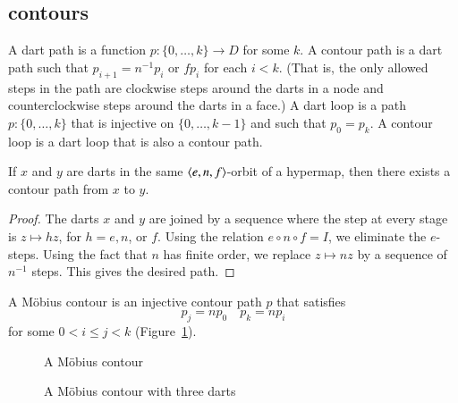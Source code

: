 \subsection{contours}

\begin{definition}  A dart path is a function $p:\{0,\ldots,k\}\to D$
for some $k$.  A contour path is a dart path such that $p_{i+1} =
n^{-1} p_i$ or $f p_i$ for each $i<k$.  (That is, the only allowed
steps in the path are clockwise steps around the darts in a node and
counterclockwise steps around the darts in a face.)  A dart loop is
a path $p:\{0,\ldots,k\}$ that is injective on $\{0,\ldots,k-1\}$
and such that $p_0 = p_k$.  A contour loop is a dart loop that is
also a contour path.
\end{definition}

\begin{lemma}\label{lemma:connect-contour}  If $x$ and $y$ are darts
in the same $\langle e,n,f\rangle$-orbit of a hypermap, then there exists
a contour path from $x$ to $y$.
\end{lemma}

\begin{proof} 
The darts
$x$ and $y$ are joined by a sequence where the step at every stage
is $z\mapsto h z$, for $h=e,n$, or $f$.  Using the relation $e\circ
n\circ f = I$, we eliminate the $e$-steps. Using the fact that $n$
has finite order, we replace $z \mapsto n z$ by a sequence
of $n^{-1}$ steps.  This gives the desired path.
\end{proof}

\begin{definition} A M\"obius contour is an
injective contour path $p$ that satisfies
    \begin{equation}
    \label{eqn:mobius}
    p_j = n p_0\quad p_k = n p_i
    \end{equation}
for some $0 < i\le j< k$ (Figure~\ref{fig:mobius}).
\end{definition}

\begin{figure}[htb]
  \centering
  \caption{A M\"obius contour}
  \label{fig:mobius}
\end{figure}

\begin{figure}[htb]
  \centering
  \caption{A M\"obius contour with three darts}
  \label{fig:3m}
\end{figure}


